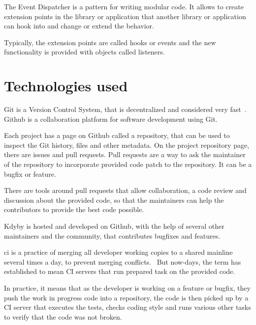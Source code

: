  \label{sec:theory:event-dispatcher}

The Event Dispatcher is a pattern for writing modular code. It allows to create extension points in the library or application that another library or application can hook into and change or extend the behavior.

Typically, the extension points are called hooks or events and the new functionality is provided with objects called listeners.

\section{Technologies used}

 \label{sec:theory:git}

Git is a Version Control System, that is decentralized and considered very fast~\cite{progit}. Github is a collaboration platform for software development using Git.

Each project has a page on Github called a repository, that can be used to inspect the Git history, files and other metadata. On the project repository page, there are issues and pull requests. Pull requests are a way to ask the maintainer of the repository to incorporate provided code patch to the repository. It can be a bugfix or feature.

There are tools around pull requests that allow collaboration, a code review and discussion about the provided code, so that the maintainers can help the contributors to provide the best code possible.

Kdyby is hosted and developed on Github, with the help of several other maintainers and the community, that contributes bugfixes and features.

 \label{sec:theory:ci}

\gls{ci} is a practice of merging all developer working copies to a shared mainline several times a day, to prevent merging conflicts.~\cite{wiki:ci} But now-days, the term has established to mean CI servers that run prepared task on the provided code.

In practice, it means that as the developer is working on a feature or bugfix, they push the work in progress code into a repository, the code is then picked up by a CI server that executes the tests, checks coding style and runs various other tasks to verify that the code was not broken.

